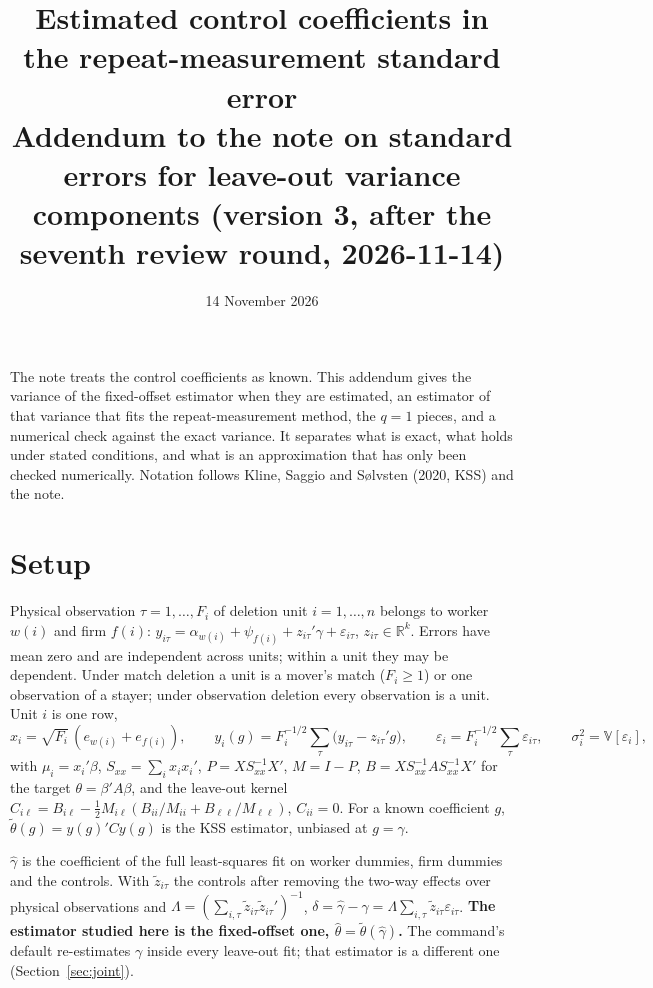 \documentclass[11pt]{article}
\title{Estimated control coefficients in the repeat-measurement standard error\\[2pt]\large Addendum to the note on standard errors for leave-out variance components (version 3, after the seventh review round, 2026-11-14)}
\date{14 November 2026}
\newcommand{\Var}{\mathbb{V}}
\begin{document}
\maketitle

\noindent The note treats the control coefficients as known. This addendum gives the variance of the fixed-offset
estimator when they are estimated, an estimator of that variance that fits the repeat-measurement method, the
$q=1$ pieces, and a numerical check against the exact variance. It separates what is exact, what holds under stated
conditions, and what is an approximation that has only been checked numerically. Notation follows Kline, Saggio and
S{\o}lvsten (2020, KSS) and the note.

\section{Setup}
Physical observation $\tau=1,\dots,F_i$ of deletion unit $i=1,\dots,n$ belongs to worker $w(i)$ and firm $f(i)$:
$y_{i\tau}=\alpha_{w(i)}+\psi_{f(i)}+z_{i\tau}'\gamma+\varepsilon_{i\tau}$, $z_{i\tau}\in\mathbb{R}^k$. Errors have mean
zero and are independent across units; within a unit they may be dependent. Under match deletion a unit is a
mover's match ($F_i\ge1$) or one observation of a stayer; under observation deletion every observation is a unit.
Unit $i$ is one row,
\[
 x_i=\sqrt{F_i}\,(e_{w(i)}+e_{f(i)}),\qquad y_i(g)=F_i^{-1/2}\sum_\tau\bigl(y_{i\tau}-z_{i\tau}'g\bigr),\qquad
 \varepsilon_i=F_i^{-1/2}\sum_\tau\varepsilon_{i\tau},\qquad \sigma_i^2=\Var[\varepsilon_i],
\]
with $\mu_i=x_i'\beta$, $S_{xx}=\sum_ix_ix_i'$, $P=XS_{xx}^{-1}X'$, $M=I-P$, $B=XS_{xx}^{-1}AS_{xx}^{-1}X'$ for the
target $\theta=\beta'A\beta$, and the leave-out kernel $C_{i\ell}=B_{i\ell}-\tfrac12M_{i\ell}(B_{ii}/M_{ii}+
B_{\ell\ell}/M_{\ell\ell})$, $C_{ii}=0$. For a known coefficient $g$, $\tilde\theta(g)=y(g)'Cy(g)$ is the KSS estimator,
unbiased at $g=\gamma$.

$\hat\gamma$ is the coefficient of the full least-squares fit on worker dummies, firm dummies and the controls.
With $\tilde z_{i\tau}$ the controls after removing the two-way effects over physical observations and
$\Lambda=(\sum_{i,\tau}\tilde z_{i\tau}\tilde z_{i\tau}')^{-1}$, $\delta=\hat\gamma-\gamma=\Lambda\sum_{i,\tau}\tilde
z_{i\tau}\varepsilon_{i\tau}$. \textbf{The estimator studied here is the fixed-offset one,
$\hat\theta=\tilde\theta(\hat\gamma)$.} The command's default re-estimates $\gamma$ inside every leave-out fit; that
estimator is a different one (Section~\ref{sec:joint}).
\end{document}
